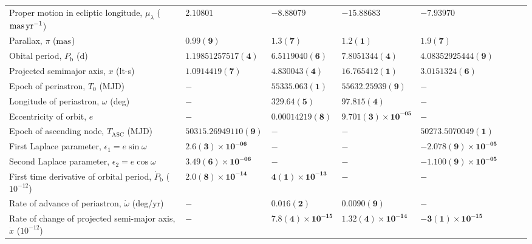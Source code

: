 \begin{table}
\begin{tabular}{llllllll}
Proper motion in ecliptic longitude, $\mu_\lambda$ (${\rm mas}\,{\rm yr}^{-1}$)	 & 	 $\mathbf{ 2.10801 }$	 & 	 $\mathbf{ -8.88079 }$	 & 	 $\mathbf{ -15.88683 }$	 & 	 $\mathbf{ -7.93970 }$\\ 
Parallax, $\pi$ (${\rm mas}$)	 & 	 $\mathbf{ 0.99(9) }$	 & 	 $\mathbf{ 1.3(7) }$	 & 	 $\mathbf{ 1.2(1) }$	 & 	 $\mathbf{ 1.9(7) }$\\ 
Obital period, $P_{\mathrm{b}}$ ($\mathrm{d}$)	 & 	 $\mathbf{ 1.19851257517(4) }$	 & 	 $\mathbf{ 6.5119040(6) }$	 & 	 $\mathbf{ 7.8051344(4) }$	 & 	 $\mathbf{ 4.08352925444(9) }$\\ 
Projected semimajor axis, $x$ (lt-s)	 & 	 $\mathbf{ 1.0914419(7) }$	 & 	 $\mathbf{ 4.830043(4) }$	 & 	 $\mathbf{ 16.765412(1) }$	 & 	 $\mathbf{ 3.0151324(6) }$\\ 
Epoch of periastron, $T_0$ (MJD)	 & 	 $\mathbf{ - }$	 & 	 $\mathbf{ 55335.063(1) }$	 & 	 $\mathbf{ 55632.25939(9) }$	 & 	 $\mathbf{ - }$\\ 
Longitude of periastron, $\omega$ (deg)	 & 	 $\mathbf{ - }$	 & 	 $\mathbf{ 329.64(5) }$	 & 	 $\mathbf{ 97.815(4) }$	 & 	 $\mathbf{ - }$\\ 
Eccentricity of orbit, $e$	 & 	 $\mathbf{ - }$	 & 	 $\mathbf{ 0.00014219(8) }$	 & 	 $\mathbf{ 9.701(3)\times 10^{-05} }$	 & 	 $\mathbf{ - }$\\ 
Epoch of ascending node, $T_{\mathrm{ASC}}$ (MJD)	 & 	 $\mathbf{ 50315.26949110(9) }$	 & 	 $\mathbf{ - }$	 & 	 $\mathbf{ - }$	 & 	 $\mathbf{ 50273.5070049(1) }$\\ 
First Laplace parameter, $\epsilon_1 = e \sin \omega$	 & 	 $\mathbf{ 2.6(3)\times 10^{-06} }$	 & 	 $\mathbf{ - }$	 & 	 $\mathbf{ - }$	 & 	 $\mathbf{ -2.078(9)\times 10^{-05} }$\\ 
Second Laplace parameter, $\epsilon_2 = e \cos \omega$	 & 	 $\mathbf{ 3.49(6)\times 10^{-06} }$	 & 	 $\mathbf{ - }$	 & 	 $\mathbf{ - }$	 & 	 $\mathbf{ -1.100(9)\times 10^{-05} }$\\ 
First time derivative of orbital period, ${\dot P}_{\mathrm{b}}$ ($10^{-12}$)	 & 	 $\mathbf{ 2.0(8)\times 10^{-14} }$	 & 	 $\mathbf{ 4(1)\times 10^{-13} }$	 & 	 $\mathbf{ - }$	 & 	 $\mathbf{ - }$\\ 
Rate of advance of periastron, ${\dot \omega}$ (deg/yr)	 & 	 $\mathbf{ - }$	 & 	 $\mathbf{ 0.016(2) }$	 & 	 $\mathbf{ 0.0090(9) }$	 & 	 $\mathbf{ - }$\\ 
Rate of change of projected semi-major axis, ${\dot x}$ ($10^{-12}$)	 & 	 $\mathbf{ - }$	 & 	 $\mathbf{ 7.8(4)\times 10^{-15} }$	 & 	 $\mathbf{ 1.32(4)\times 10^{-14} }$	 & 	 $\mathbf{ -3(1)\times 10^{-15} }$\\ 

\end{tabular}
\end{table}
